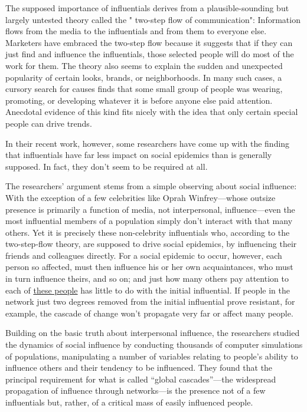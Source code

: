 The supposed importance of influentials derives from a
plausible-sounding but largely untested theory called the " two-step
flow of communication": Information flows from the media to the
influentials and from them to everyone else. Marketers have embraced the
two-step flow because it suggests that if they can just find and
influence the influentials, those selected people will do most of the
work for them. The theory also seems to explain the sudden and
unexpected popularity of certain looks, brands, or neighborhoods. In
many such cases, a cursory search for causes finds that some small group
of people was wearing, promoting, or developing whatever it is before
anyone else paid attention. Anecdotal evidence of this kind fits nicely
with the idea that only certain special people can drive trends.

In their recent work, however, some researchers have come up with the
finding that influentials have far less impact on social epidemics than
is generally supposed. In fact, they don't seem to be required at all.

The researchers' argument stems from a simple observing about social
influence: With the exception of a few celebrities like Oprah
Winfrey---whose outsize presence is primarily a function of media, not
interpersonal, influence---even the most influential members of a
population simply don't interact with that many others. Yet it is
precisely these non-celebrity influentials who, according to the
two-step-flow theory, are supposed to drive social epidemics, by
influencing their friends and colleagues directly. For a social epidemic
to occur, however, each person so affected, must then influence his or
her own acquaintances, who must in turn influence theirs, and so on; and
just how many others pay attention to each of \uline{these people} has little to
do with the initial influential. If people in the network just two
degrees removed from the initial influential prove resistant, for
example, the cascade of change won't propagate very far or affect many
people.

Building on the basic truth about interpersonal influence, the
researchers studied the dynamics of social influence by conducting
thousands of computer simulations of populations, manipulating a number
of variables relating to people's ability to influence others and their
tendency to be influenced. They found that the principal requirement for
what is called ``global cascades''---the widespread propagation of
influence through networks---is the presence not of a few influentials
but, rather, of a critical mass of easily influenced people.


